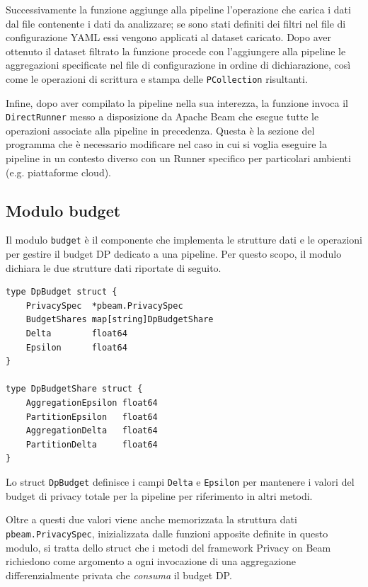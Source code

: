 Successivamente la funzione aggiunge alla pipeline l'operazione che carica i dati dal file contenente i dati da analizzare; se sono stati definiti dei filtri nel file di configurazione YAML essi vengono applicati al dataset caricato. Dopo aver ottenuto il dataset filtrato la funzione procede con l'aggiungere alla pipeline le aggregazioni specificate nel file di configurazione in ordine di dichiarazione, così come le operazioni di scrittura e stampa delle \texttt{PCollection} risultanti.

Infine, dopo aver compilato la pipeline nella sua interezza, la funzione invoca il \texttt{DirectRunner} messo a disposizione da Apache Beam che esegue tutte le operazioni associate alla pipeline in precedenza. Questa è la sezione del programma che è necessario modificare nel caso in cui si voglia eseguire la pipeline in un contesto diverso con un Runner specifico per particolari ambienti (e.g. piattaforme cloud).

\subsection{Modulo budget}
Il modulo \texttt{budget} è il componente che implementa le strutture dati e le operazioni per gestire il budget DP dedicato a una pipeline. Per questo scopo, il modulo dichiara le due strutture dati riportate di seguito.

\begin{verbatim}
type DpBudget struct {
	PrivacySpec  *pbeam.PrivacySpec
	BudgetShares map[string]DpBudgetShare
	Delta        float64
	Epsilon      float64
}

type DpBudgetShare struct {
	AggregationEpsilon float64
	PartitionEpsilon   float64
	AggregationDelta   float64
	PartitionDelta     float64
}
\end{verbatim}

Lo struct \texttt{DpBudget} definisce i campi \texttt{Delta} e \texttt{Epsilon} per mantenere i valori del budget di privacy totale per la pipeline per riferimento in altri metodi.

Oltre a questi due valori viene anche memorizzata la struttura dati \texttt{pbeam.PrivacySpec}, inizializzata dalle funzioni apposite definite in questo modulo, si tratta dello struct che i metodi del framework Privacy on Beam richiedono come argomento a ogni invocazione di una aggregazione differenzialmente privata che \textit{consuma} il budget DP.

